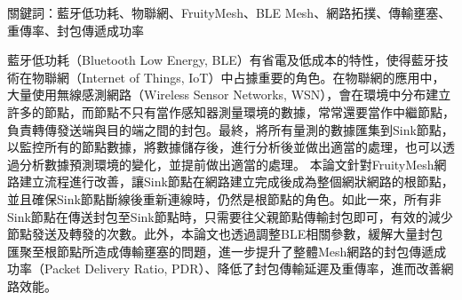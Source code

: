 \begin{ZhAbstract}
    \begin{ZhAbstractItems}
        \noindent \text 關鍵詞：藍牙低功耗、物聯網、FruityMesh、BLE Mesh、網路拓撲、傳輸壅塞、重傳率、封包傳遞成功率

    \end{ZhAbstractItems}

    \begin{ZhAbstractDescription}
        藍牙低功耗（Bluetooth Low Energy, BLE）有省電及低成本的特性，使得藍牙技術在物聯網（Internet of Things, IoT）中占據重要的角色。在物聯網的應用中，大量使用無線感測網路（Wireless Sensor Networks, WSN），會在環境中分布建立許多的節點，而節點不只有當作感知器測量環境的數據，常常還要當作中繼節點，負責轉傳發送端與目的端之間的封包。最終，將所有量測的數據匯集到Sink節點，以監控所有的節點數據，將數據儲存後，進行分析後並做出適當的處理，也可以透過分析數據預測環境的變化，並提前做出適當的處理。
本論文針對FruityMesh網路建立流程進行改善，讓Sink節點在網路建立完成後成為整個網狀網路的根節點，並且確保Sink節點斷線後重新連線時，仍然是根節點的角色。如此一來，所有非Sink節點在傳送封包至Sink節點時，只需要往父親節點傳輸封包即可，有效的減少節點發送及轉發的次數。此外，本論文也透過調整BLE相關參數，緩解大量封包匯聚至根節點所造成傳輸壅塞的問題，進一步提升了整體Mesh網路的封包傳遞成功率（Packet Delivery Ratio, PDR）、降低了封包傳輸延遲及重傳率，進而改善網路效能。
    \end{ZhAbstractDescription}
    
\end{ZhAbstract}

